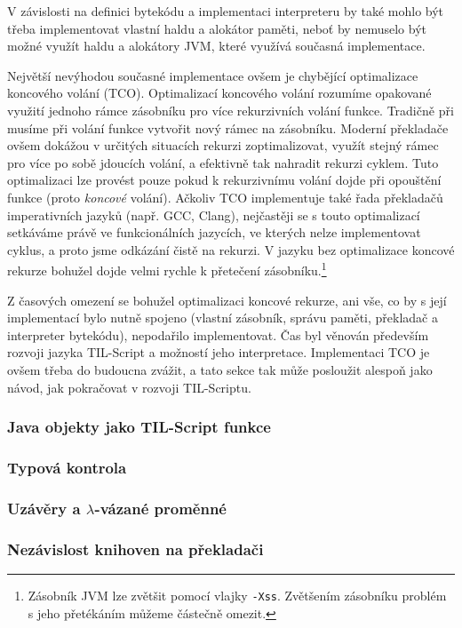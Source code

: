 V závislosti na definici bytekódu a implementaci interpreteru by také mohlo být třeba implementovat
vlastní haldu a alokátor paměti, neboť by nemuselo být možné využít haldu a alokátory JVM, které
využívá současná implementace.

Největší nevýhodou současné implementace ovšem je chybějící optimalizace koncového volání (TCO).
Optimalizací koncového volání rozumíme opakované využití jednoho rámce zásobníku pro více
rekurzivních volání funkce. Tradičně při musíme při volání funkce vytvořit nový rámec na zásobníku.
Moderní překladače ovšem dokážou v určitých situacích rekurzi zoptimalizovat, využít stejný rámec
pro více po sobě jdoucích volání, a efektivně tak nahradit rekurzi cyklem. Tuto optimalizaci lze
provést pouze pokud k rekurzivnímu volání dojde při opouštění funkce (proto \textit{koncové}
volání). Ačkoliv TCO implementuje také řada překladačů imperativních jazyků (např. GCC, Clang),
nejčastěji se s touto optimalizací setkáváme právě ve funkcionálních jazycích, ve kterých nelze
implementovat cyklus, a proto jsme odkázání čistě na rekurzi. V jazyku bez optimalizace koncové
rekurze bohužel dojde velmi rychle k přetečení zásobníku.\footnote{
  Zásobník JVM lze zvětšit pomocí vlajky \lstinline{-Xss}. Zvětšením zásobníku problém s jeho
  přetékáním můžeme částečně omezit.
}

Z časových omezení se bohužel optimalizaci koncové rekurze, ani vše, co by s její implementací bylo
nutně spojeno (vlastní zásobník, správu paměti, překladač a interpreter bytekódu), nepodařilo
implementovat. Čas byl věnován především rozvoji jazyka TIL-Script a možností jeho interpretace.
Implementaci TCO je ovšem třeba do budoucna zvážit, a tato sekce tak může posloužit alespoň jako
návod, jak pokračovat v rozvoji TIL-Scriptu.

\subsubsection{Java objekty jako TIL-Script funkce}

\subsubsection{Typová kontrola}

\subsubsection{Uzávěry a $\lambda$-vázané proměnné}

\subsubsection{Nezávislost knihoven na překladači}

